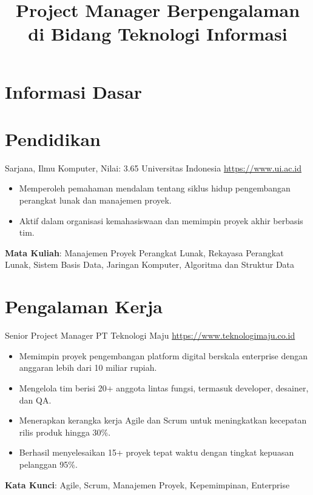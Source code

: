 \documentclass[a4paper, serif, 10pt]{moderncv}
\title{Project Manager Berpengalaman di Bidang Teknologi Informasi}
\begin{document}
\maketitle

\section{Informasi Dasar}

\section{Pendidikan}

        {Sarjana, Ilmu Komputer, Nilai: 3.65}
        {Universitas Indonesia}
        {\url{https://www.ui.ac.id}}
        {}
        {\begin{itemize}
\item Memperoleh pemahaman mendalam tentang siklus hidup pengembangan perangkat lunak dan manajemen proyek.
\item Aktif dalam organisasi kemahasiswaan dan memimpin proyek akhir berbasis tim.
\end{itemize}
\textbf{Mata Kuliah}: Manajemen Proyek Perangkat Lunak, Rekayasa Perangkat Lunak, Sistem Basis Data, Jaringan Komputer, Algoritma dan Struktur Data}
\section{Pengalaman Kerja}

        {Senior Project Manager}
        {PT Teknologi Maju}
        {\url{https://www.teknologimaju.co.id}}
        {}
        {\begin{itemize}
\item Memimpin proyek pengembangan platform digital berskala enterprise dengan anggaran lebih dari 10 miliar rupiah.
\item Mengelola tim berisi 20+ anggota lintas fungsi, termasuk developer, desainer, dan QA.
\item Menerapkan kerangka kerja Agile dan Scrum untuk meningkatkan kecepatan rilis produk hingga 30\%.
\item Berhasil menyelesaikan 15+ proyek tepat waktu dengan tingkat kepuasan pelanggan 95\%.
\end{itemize}
\textbf{Kata Kunci}: Agile, Scrum, Manajemen Proyek, Kepemimpinan, Enterprise}
\end{document}
